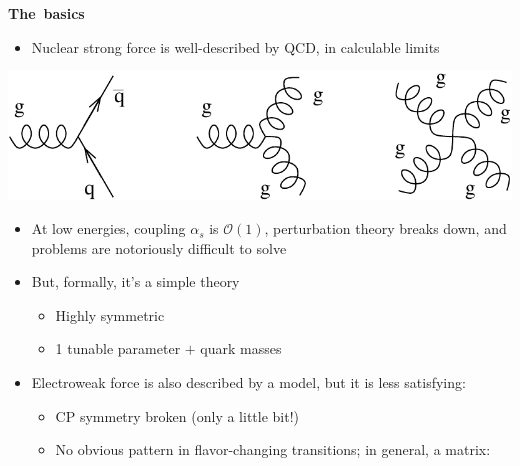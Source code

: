 \documentclass[landscape]{article}
\newenvironment{slide}[1][ ]{\mbox{\bf \boldmath #1 } \vfill}{\vfill \vspace{-1.5 cm} \mbox{ } \pagebreak}
\newenvironment{itemizer}[1]{\begin{itemize}\setlength{\itemsep}{#1}}{\end{itemize}}
\begin{document}
\begin{slide}[The basics]

\begin{minipage}{0.6\linewidth}
  \begin{itemize}
    \item Nuclear strong force is well-described by QCD, in calculable limits
  \end{itemize}
\end{minipage} \hfill \begin{minipage}{0.35\linewidth}
  \includegraphics[width=\linewidth]{../diagram_qcd}
\end{minipage}

\vspace{0.5 cm}
\begin{itemizer}{0.5 cm}

  \item At low energies, coupling $\alpha_s$ is $\mathcal{O}(1)$,
  perturbation theory breaks down, and problems are notoriously
  difficult to solve

  \item But, formally, it's a simple theory

    \begin{itemizer}{0.5 cm}

      \item Highly symmetric

      \item 1 tunable parameter $+$ quark masses

    \end{itemizer}

  \item Electroweak force is also described by a model, but it is less satisfying:

    \begin{itemizer}{0.5 cm}

      \item CP symmetry broken (only a little bit!)

      \item No obvious pattern in flavor-changing transitions; in general, a matrix:


\end{itemizer}
\end{itemizer}
\end{slide}
\end{document}
